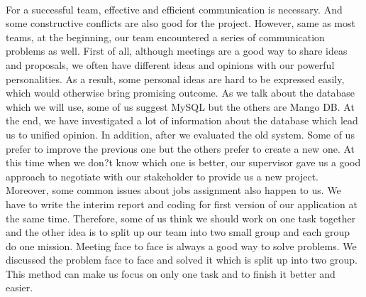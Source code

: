 \documentclass[12pt,a4paper]{report}
\begin{document}
  
 \paragraph{}
 For a successful team, effective and efficient communication is necessary. And some constructive conflicts are also good for the project. However, same as most teams, at the beginning, our team encountered a series of communication problems as well. First of all, although meetings are a good way to share ideas and proposals, we often have different ideas and opinions with our powerful personalities. As a result, some personal ideas are hard to be expressed easily, which would otherwise bring promising outcome. As we talk about the database which we will use, some of us suggest MySQL but the others are Mango DB. At the end, we have investigated a lot of information about the database which lead us to unified opinion. In addition, after we evaluated the old system. Some of us prefer to improve the previous one but the others prefer to create a new one. At this time when we don?t know which one is better, our supervisor gave us a good approach to negotiate with our stakeholder to provide us a new project. Moreover, some common issues about jobs assignment also happen to us. We have to write the interim report and coding for first version of our application at the same time. Therefore, some of us think we should work on one task together and the other idea is to split up our team into two small group and each group do one mission. Meeting face to face is always a good way to solve problems. We discussed the problem face to face and solved it which is split up into two group. This method can make us focus on only one task and to finish it better and easier. 

 
\end{document}
